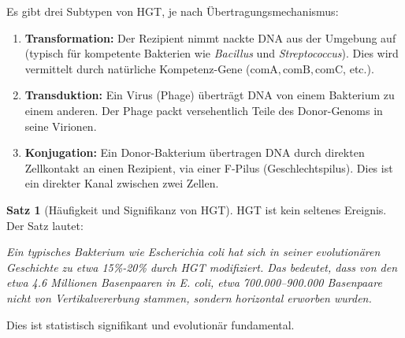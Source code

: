 \documentclass[a4paper,12pt]{article}
\theoremstyle{definition}
\newtheorem{satz}{Satz}
\begin{document}
Es gibt drei Subtypen von HGT, je nach Übertragungsmechanismus:

\begin{enumerate}
    \item \textbf{Transformation:} Der Rezipient nimmt nackte DNA aus der Umgebung auf (typisch für kompetente Bakterien wie \textit{Bacillus} und \textit{Streptococcus}). Dies wird vermittelt durch natürliche Kompetenz-Gene ($\text{comA}, \text{comB}, \text{comC}$, etc.).
    
    \item \textbf{Transduktion:} Ein Virus (Phage) überträgt DNA von einem Bakterium zu einem anderen. Der Phage packt versehentlich Teile des Donor-Genoms in seine Virionen.
    
    \item \textbf{Konjugation:} Ein Donor-Bakterium übertragen DNA durch direkten Zellkontakt an einen Rezipient, via einer F-Pilus (Geschlechtspilus). Dies ist ein direkter Kanal zwischen zwei Zellen.
\end{enumerate}

\begin{satz}[Häufigkeit und Signifikanz von HGT]
HGT ist kein seltenes Ereignis. Der Satz lautet:

\textit{Ein typisches Bakterium wie \textit{Escherichia coli} hat sich in seiner evolutionären Geschichte zu etwa 15\%-20\% durch HGT modifiziert. Das bedeutet, dass von den etwa 4.6 Millionen Basenpaaren in \textit{E. coli}, etwa 700.000--900.000 Basenpaare nicht von Vertikalvererbung stammen, sondern horizontal erworben wurden.}

Dies ist statistisch signifikant und evolutionär fundamental.
\end{satz}
\end{document}
